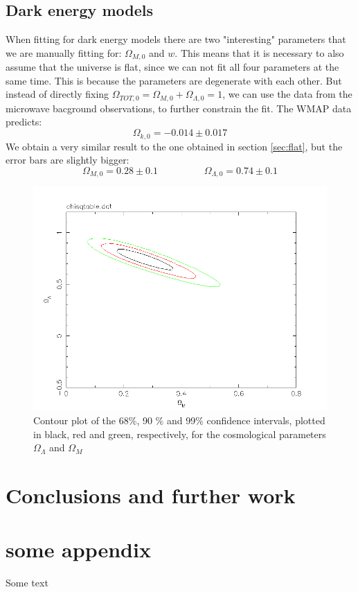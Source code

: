 \documentclass[11pt]{article}
\begin{document}
\subsection{Dark energy models}
When fitting for dark energy models there are two "interesting" parameters that we are manually fitting for: $\Omega_{M,0}$ and $w$. This means that it is necessary to also assume that the universe is flat, since we can not fit all four parameters at the same time. This is because the parameters are degenerate with each other. But instead of directly fixing $\Omega_{TOT,0} = \Omega_{M,0} + \Omega_{\Lambda,0} = 1$, we can use the data from the microwave bacground observations, to further constrain the fit. The WMAP data predicts:
\begin{equation}
	\Omega_{k,0} = -0.014 \pm 0.017
	\label{res:WMAP}
\end{equation}
We obtain a very similar result to the one obtained in section \ref{sec:flat}, but the error bars are slightly bigger: 
\begin{equation}
	\Omega_{M,0} = 0.28 \pm 0.1
	\hspace{2cm}
	\Omega_{\Lambda,0} = 0.74 \pm 0.1
	\label{res:dark}
\end{equation}
\begin{figure}[htbp]
	\centering
	\includegraphics[width=0.8\linewidth]{dark.png}
	\caption{Contour plot of the 68\%, 90 \% and 99\% confidence intervals, plotted in black, red and green, respectively, for the cosmological parameters $\Omega_\Lambda$ and $\Omega_M$}
	\label{fig:dark}
\end{figure}

\section{Conclusions and further work}




\newpage

\appendix
\section{some appendix} 
Some text
\end{document}
